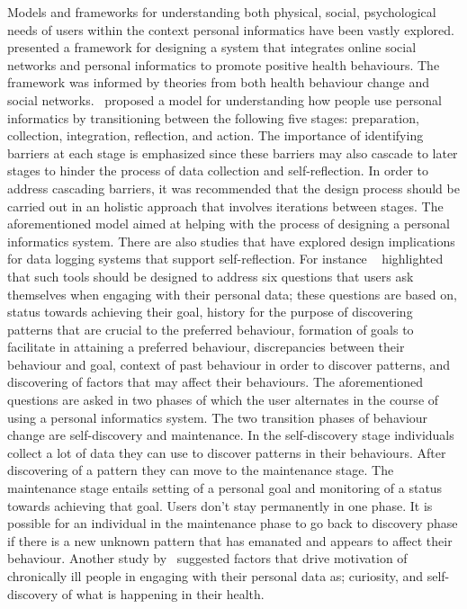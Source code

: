 Models and frameworks for understanding both physical, social, psychological needs of users within the context personal informatics have been vastly explored.~\cite{kamal2010understanding} presented a framework for designing a system that integrates online social networks and personal informatics to promote positive health behaviours. The framework was informed by theories from both health behaviour change and social networks.~\cite{li2010stage} proposed a model for understanding how people use personal informatics by transitioning between the following five stages: preparation, collection, integration, reflection, and action. The importance of identifying barriers at each stage is emphasized since these barriers may also cascade to later stages to hinder the process of data collection and self-reflection. In order to address cascading barriers, it was recommended that the design process should be carried out in an holistic approach that involves iterations between stages. The aforementioned model aimed at helping with the process of designing a personal informatics system. There are also studies that have explored design implications for data logging systems that support self-reflection. For instance ~\cite{li2011understanding} highlighted that such tools should be designed to address six questions that users ask themselves when engaging with their personal data; these questions are based on, status towards achieving their goal, history for the purpose of discovering patterns that are crucial to the preferred behaviour, formation of goals to facilitate in attaining a preferred behaviour, discrepancies between their behaviour and goal, context of past behaviour in order to discover patterns, and discovering of factors that may affect their behaviours. The aforementioned questions are asked in two phases of which the user alternates in the course of using a personal informatics system. The two transition phases of behaviour change are self-discovery and maintenance. In the self-discovery stage individuals collect a lot of data they can use to discover patterns in their behaviours. After discovering of a pattern they can move to the maintenance stage. The maintenance stage entails setting of a personal goal and monitoring of a status towards achieving that goal. Users don't stay permanently in one phase. It is possible for an individual in the maintenance phase to go back to discovery phase if there is a new unknown pattern that has emanated and appears to affect their behaviour. Another study by~\cite{macleod2013personal} suggested factors that drive motivation of chronically ill people in engaging with their personal data as; curiosity, and self-discovery of what is happening in their health.

